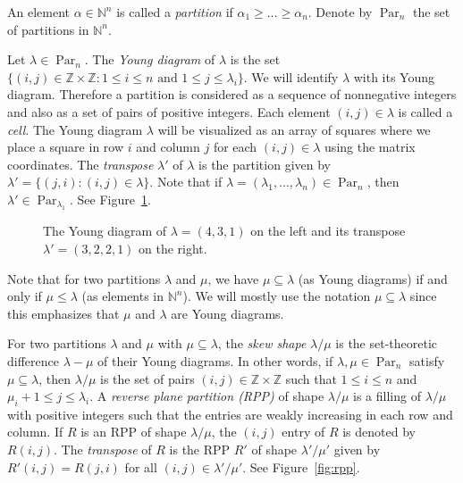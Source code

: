 \documentclass[12pt]{amsart}
\numberwithin{equation}{section}
\theoremstyle{definition}
\newcommand\ZZ{\mathbb{Z}}
\newcommand\NN{\mathbb{N}}
\newcommand\Par{\operatorname{Par}}
\newcommand\lm{{\lambda/\mu}}
\begin{document}
An element $\alpha\in\NN^n$ is called a \emph{partition} if
$\alpha_1\ge\dots\ge\alpha_n$. Denote by $\Par_n$ the set of partitions in
$\NN^n$.

Let $\lambda\in\Par_n$. The \emph{Young diagram} of $\lambda$ is the set
$\{(i,j)\in\ZZ\times\ZZ: 1\le i\le n \mbox{ and } 1\le j\le \lambda_i \}$. We
will identify $\lambda$ with its Young diagram. Therefore a partition is
considered as a sequence of nonnegative integers and also as a set of pairs of
positive integers. Each element $(i,j)\in\lambda$ is called a \emph{cell}. The
Young diagram $\lambda$ will be visualized as an array of squares where we place
a square in row $i$ and column $j$ for each $(i,j)\in\lambda$ using the matrix
coordinates. The \emph{transpose} $\lambda'$ of $\lambda$ is the partition given
by $\lambda'=\{(j,i):(i,j)\in\lambda\}$. Note that if
$\lambda=(\lambda_1,\dots,\lambda_n)\in\Par_n$, then
$\lambda'\in \Par_{\lambda_1}$. See Figure~\ref{fig:yd}.


\begin{figure}
  \centering
    \qquad \qquad \qquad {}
  \caption{The Young diagram of $\lambda=(4,3,1)$ on the left and its transpose
  $\lambda'=(3,2,2,1)$ on the right.}
  \label{fig:yd}
\end{figure}

Note that for two partitions $\lambda$ and $\mu$, we have $\mu\subseteq\lambda$
(as Young diagrams) if and only if $\mu\le \lambda$ (as elements in $\NN^n$). We
will mostly use the notation $\mu\subseteq\lambda$ since this emphasizes that
$\mu$ and $\lambda$ are Young diagrams.

For two partitions $\lambda$ and $\mu$ with $\mu\subseteq\lambda$, the
\emph{skew shape} $\lambda/\mu$ is the set-theoretic difference $\lambda-\mu$ of
their Young diagrams. In other words, if $\lambda,\mu\in\Par_n$ satisfy
$\mu\subseteq\lambda$, then $\lm$ is the set of pairs $(i,j)\in\ZZ\times\ZZ$
such that $1\le i\le n$ and $\mu_i+1\le j\le \lambda_i$. A \emph{reverse plane
  partition (RPP)} of shape $\lm$ is a filling of $\lm$ with positive integers
such that the entries are weakly increasing in each row and column. If $R$ is an
RPP of shape $\lm$, the $(i,j)$ entry of $R$ is denoted by $R(i,j)$. The
\emph{transpose} of $R$ is the RPP $R'$ of shape $\lambda'/\mu'$ given by
$R'(i,j)=R(j,i)$ for all $(i,j)\in\lambda'/\mu'$. See Figure~\ref{fig:rpp}.
\end{document}
